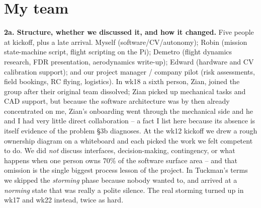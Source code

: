 \section{My team}

\textbf{2a. Structure, whether we discussed it, and how it changed.}  Five people at kickoff, plus a late arrival. Myself (software/CV/autonomy); Robin (mission state-machine script, flight scripting on the Pi); Demetro (flight dynamics research, FDR presentation, aerodynamics write-up); Edward (hardware and CV calibration support); and our project manager / company pilot (risk assessments, field bookings, RC flying, logistics). In wk18 a sixth person, Zian, joined the group after their original team dissolved; Zian picked up mechanical tasks and CAD support, but because the software architecture was by then already concentrated on me, Zian's onboarding went through the mechanical side and he and I had very little direct collaboration -- a fact I list here because its absence is itself evidence of the problem \S3b diagnoses. At the wk12 kickoff we drew a rough ownership diagram on a whiteboard and each picked the work we felt competent to do. We did \textit{not} discuss interfaces, decision-making, contingency, or what happens when one person owns 70\% of the software surface area -- and that omission is the single biggest process lesson of the project. In Tuckman's terms \cite{tuckman1965} we skipped the \textit{storming} phase because nobody wanted to, and arrived at a \textit{norming} state that was really a polite silence. The real storming turned up in wk17 and wk22 instead, twice as hard.


